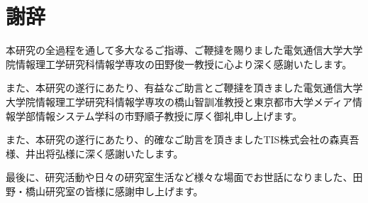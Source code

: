 \documentclass[11pt,a4j, titlepage]{jarticle} %
\begin{document}
\newpage
\section*{謝辞}
本研究の全過程を通して多大なるご指導、ご鞭撻を賜りました電気通信大学大学院情報理工学研究科情報学専攻の田野俊一教授に心より深く感謝いたします。

また、本研究の遂行にあたり、有益なご助言とご鞭撻を頂きました電気通信大学大学院情報理工学研究科情報学専攻の橋山智訓准教授と東京都市大学メディア情報学部情報システム学科の市野順子教授に厚く御礼申し上げます。

また、本研究の遂行にあたり、的確なご助言を頂きましたTIS株式会社の森真吾様、井出将弘様に深く感謝いたします。

最後に、研究活動や日々の研究室生活など様々な場面でお世話になりました、田野・橋山研究室の皆様に感謝申し上げます。
\end{document}
